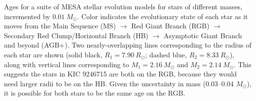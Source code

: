 \label{fig:mesa} Ages for a suite of MESA stellar evolution models for stars of different masses, incremented by $0.01 \ M_\odot$. Color indicates the evolutionary state of each star as it moves from the Main Sequence (MS) $\rightarrow$ Red Giant Branch (RGB) $\rightarrow$ Secondary Red Clump/Horizontal Branch (HB) $\rightarrow$ Asymptotic Giant Branch and beyond (AGB+). Two nearly-overlapping lines corresponding to the radius of each star are shown (solid black, $R_1 = 7.90 \ R_\odot$; dashed blue, $R_2 = 8.33 \ R_\odot$), along with vertical lines corresponding to $M_1 = 2.16 \ M_\odot$ and $M_2 = 2.14 \ M_\odot$. This suggests the stars in KIC 9246715 are both on the RGB, because they would need larger radii to be on the HB. Given the uncertainty in mass (0.03--0.04 $M_\odot$), it is possible for both stars to be the same age on the RGB.

  